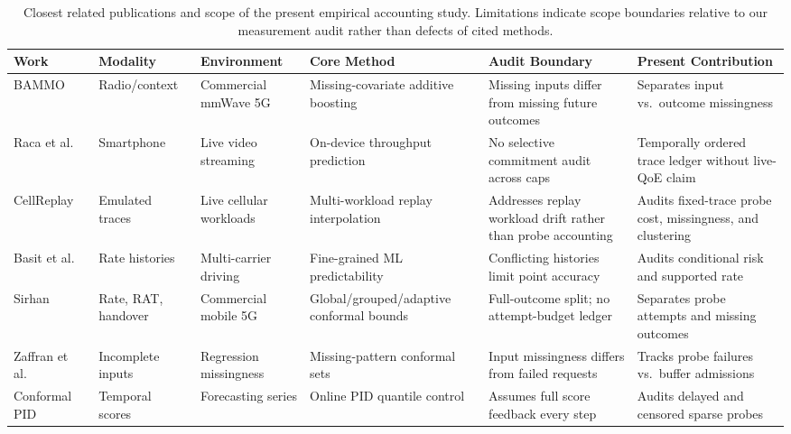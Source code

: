 \begin{table}[t]
\caption{Closest related publications and scope of the present empirical accounting study. Limitations indicate scope boundaries relative to our measurement audit rather than defects of cited methods.}
\label{tab:related_comparison}
\centering
\footnotesize
\setlength{\tabcolsep}{3pt}
\renewcommand{\arraystretch}{1.05}
\begin{tabularx}{\textwidth}{@{}>{\raggedright\arraybackslash}p{}>{\raggedright\arraybackslash}p{}>{\raggedright\arraybackslash}p{}>{\raggedright\arraybackslash}X>{\raggedright\arraybackslash}X>{\raggedright\arraybackslash}X@{}}
\hline
\textbf{Work} & \textbf{Modality} & \textbf{Environment} & \textbf{Core Method} & \textbf{Audit Boundary} & \textbf{Present Contribution} \\
\hline
BAMMO~\cite{jacobson2025} & Radio/context & Commercial mmWave 5G & Missing-covariate additive boosting & Missing inputs differ from missing future outcomes & Separates input vs.\ outcome missingness \\
Raca et al.~\cite{raca2024} & Smartphone & Live video streaming & On-device throughput prediction & No selective commitment audit across caps & Temporally ordered trace ledger without live-QoE claim \\
CellReplay~\cite{sentosa2025cellreplay} & Emulated traces & Live cellular workloads & Multi-workload replay interpolation & Addresses replay workload drift rather than probe accounting & Audits fixed-trace probe cost, missingness, and clustering \\
Basit et al.~\cite{basit2024} & Rate histories & Multi-carrier driving & Fine-grained ML predictability & Conflicting histories limit point accuracy & Audits conditional risk and supported rate \\
Sirhan~\cite{sirhan2026} & Rate, RAT, handover & Commercial mobile 5G & Global/grouped/adaptive conformal bounds & Full-outcome split; no attempt-budget ledger & Separates probe attempts and missing outcomes \\
Zaffran et al.~\cite{zaffran2023} & Incomplete inputs & Regression missingness & Missing-pattern conformal sets & Input missingness differs from failed requests & Tracks probe failures vs.\ buffer admissions \\
Conformal PID~\cite{pid2023} & Temporal scores & Forecasting series & Online PID quantile control & Assumes full score feedback every step & Audits delayed and censored sparse probes \\

\end{tabularx}
\end{table}
